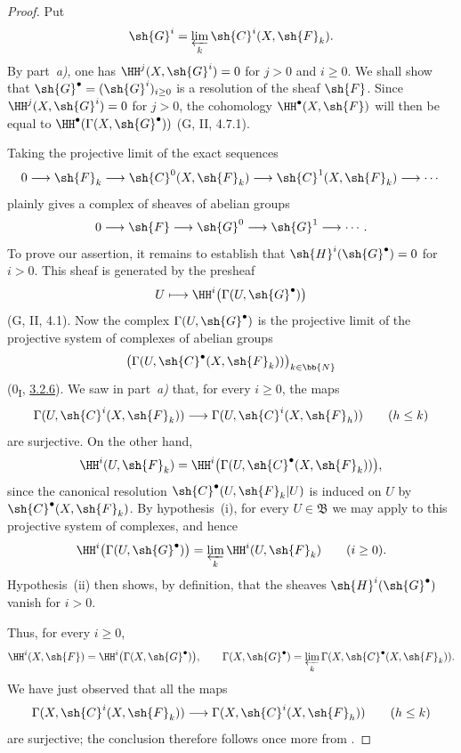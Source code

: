\begin{proof}
Put
\[
  \sh{G}^i=\varprojlim_k\sh{C}^i(X,\sh{F}_k).
\]
By part~\emph{a)}, one has
$\HH^j(X,\sh{G}^i)=0$ for $j>0$ and $i\geq0$.
We shall show that
$\sh{G}^\bullet=(\sh{G}^i)_{i\geq0}$ is a resolution of the sheaf
$\sh{F}$. Since $\HH^j(X,\sh{G}^i)=0$ for $j>0$, the cohomology
$\HH^\bullet(X,\sh{F})$ will then be equal to
$\HH^\bullet(\Gamma(X,\sh{G}^\bullet))$ (G, II, 4.7.1).

Taking the projective limit of the exact sequences
\[
  0\longrightarrow\sh{F}_k
  \longrightarrow\sh{C}^0(X,\sh{F}_k)
  \longrightarrow\sh{C}^1(X,\sh{F}_k)
  \longrightarrow\cdots
\]
plainly gives a complex of sheaves of abelian groups
\[
  0\longrightarrow\sh{F}
  \longrightarrow\sh{G}^0
  \longrightarrow\sh{G}^1
  \longrightarrow\cdots.
\]
To prove our assertion, it remains to establish that
$\sh{H}^i(\sh{G}^\bullet)=0$ for $i>0$.
This sheaf is generated by the presheaf
\[
  U\longmapsto\HH^i\bigl(\Gamma(U,\sh{G}^\bullet)\bigr)
\]
(G, II, 4.1).
Now the complex $\Gamma(U,\sh{G}^\bullet)$ is the projective limit of
the projective system of complexes of abelian groups
\[
  \bigl(\Gamma(U,\sh{C}^\bullet(X,\sh{F}_k))\bigr)_{k\in\bb{N}}
\]
(0\textsubscript{I}, \hyperref[0.3.2.6]{3.2.6}).
We saw in part~\emph{a)} that, for every $i\geq0$, the maps
\[
  \Gamma(U,\sh{C}^i(X,\sh{F}_k))
  \longrightarrow
  \Gamma(U,\sh{C}^i(X,\sh{F}_h))
  \qquad(h\leq k)
\]
are surjective. On the other hand,
\[
  \HH^i(U,\sh{F}_k)
  =
  \HH^i\bigl(\Gamma(U,\sh{C}^\bullet(X,\sh{F}_k))\bigr),
\]
since the canonical resolution $\sh{C}^\bullet(U,\sh{F}_k|U)$ is
induced on $U$ by $\sh{C}^\bullet(X,\sh{F}_k)$.
By hypothesis~{\rm(i)}, for every $U\in\mathfrak{B}$ we may apply
 to this projective system of complexes, and hence
\[
  \HH^i\bigl(\Gamma(U,\sh{G}^\bullet)\bigr)
  =
  \varprojlim_k\HH^i(U,\sh{F}_k)
  \qquad(i\geq0).
\]
Hypothesis~{\rm(ii)} then shows, by definition, that the sheaves
$\sh{H}^i(\sh{G}^\bullet)$ vanish for $i>0$.

Thus, for every $i\geq0$,
\[
  \HH^i(X,\sh{F})
  =
  \HH^i\bigl(\Gamma(X,\sh{G}^\bullet)\bigr),
  \qquad
  \Gamma(X,\sh{G}^\bullet)
  =
  \varprojlim_k\Gamma(X,\sh{C}^\bullet(X,\sh{F}_k)).
\]
We have just observed that all the maps
\[
  \Gamma(X,\sh{C}^i(X,\sh{F}_k))
  \longrightarrow
  \Gamma(X,\sh{C}^i(X,\sh{F}_h))
  \qquad(h\leq k)
\]
are surjective; the conclusion therefore follows once more from
.
\end{proof}

